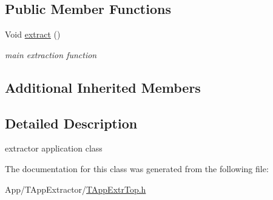 \subsection*{Public Member Functions}
\begin{DoxyCompactItemize}
\item 
\mbox{\label{class_t_app_extr_top_a99c63b5e33e4aa187dd2ea466002a4f8}} 
Void \hyperlink{class_t_app_extr_top_a99c63b5e33e4aa187dd2ea466002a4f8}{extract} ()
\begin{DoxyCompactList}\small\item\em main extraction function \end{DoxyCompactList}\end{DoxyCompactItemize}
\subsection*{Additional Inherited Members}


\subsection{Detailed Description}
extractor application class 

The documentation for this class was generated from the following file\+:\begin{DoxyCompactItemize}
\item 
App/\+T\+App\+Extractor/\hyperlink{_t_app_extr_top_8h}{T\+App\+Extr\+Top.\+h}\end{DoxyCompactItemize}
